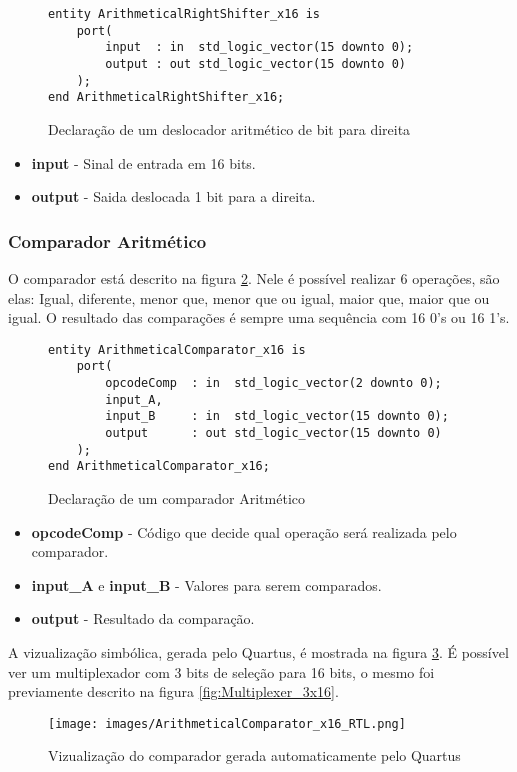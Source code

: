 \documentclass{article}
\newcommand\tab[1][0.50cm]{\hspace*{#1}}
\begin{document}
				\begin{figure}[H]
					\centering
					\caption[Deslocador aritm\'{e}tico de bit para direita]{Declara\c{c}\~{a}o de um deslocador aritm\'{e}tico de bit para direita}
					\label{fig:ArithmeticalRightShifter_x16}	
					\begin{lstlisting}[style=vhdl]
entity ArithmeticalRightShifter_x16 is
	port(
		input  : in  std_logic_vector(15 downto 0);
		output : out std_logic_vector(15 downto 0)
	);
end ArithmeticalRightShifter_x16;
					\end{lstlisting}
				\end{figure}
				\begin{itemize}
					\item \textbf{input} - Sinal de entrada em 16 bits.
					\item \textbf{output} - Saida deslocada 1 bit para a direita.
				\end{itemize}
			\subsubsection[Comparador aritm\'{e}tico]{Comparador Aritm\'{e}tico}
				\tab O comparador est\'{a} descrito na figura \ref{fig:ArithmeticalComparator_x16}. Nele \'{e} poss\'{i}vel realizar 6 opera\c{c}\~{o}es, s\~{a}o elas: Igual, diferente, menor que, menor que ou igual, maior que, maior que ou igual. O resultado das compara\c{c}\~{o}es \'{e} sempre uma sequ\^{e}ncia com 16 0's ou 16 1's.
				\begin{figure}[H]
					\centering
					\caption[Comparador Aritm\'{e}tico]{Declara\c{c}\~{a}o de um comparador Aritm\'{e}tico}
					\label{fig:ArithmeticalComparator_x16}
					\begin{lstlisting}[style=vhdl]
entity ArithmeticalComparator_x16 is
	port(
		opcodeComp  : in  std_logic_vector(2 downto 0);
		input_A,
		input_B 	: in  std_logic_vector(15 downto 0);
		output 		: out std_logic_vector(15 downto 0)
	);
end ArithmeticalComparator_x16;
					\end{lstlisting}
				\end{figure}
				\begin{itemize}
					\item \textbf{opcodeComp} - C\'{o}digo que decide qual opera\c{c}\~{a}o ser\'{a} realizada pelo comparador.
					\item \textbf{input\_A} e \textbf{input\_B} - Valores para serem comparados.
					\item \textbf{output} - Resultado da compara\c{c}\~{a}o.
				\end{itemize}
				\tab A vizualiza\c{c}\~{a}o simb\'{o}lica, gerada pelo Quartus, \'{e} mostrada na figura \ref{fig:ArithmeticalComparator_x16_RTL}. \'{E} poss\'{i}vel ver um multiplexador com 3 bits de sele\c{c}\~{a}o para 16 bits, o mesmo foi previamente descrito na figura \ref{fig:Multiplexer_3x16}.
				\begin{figure}[H]
					\centering
					\caption[Vizualiza\c{c}\~{a}o do comparador]{Vizualiza\c{c}\~{a}o do comparador gerada automaticamente pelo Quartus}
					\label{fig:ArithmeticalComparator_x16_RTL}
					\texttt{[image: images/ArithmeticalComparator\_x16\_RTL.png]}
				\end{figure}
\end{document}
